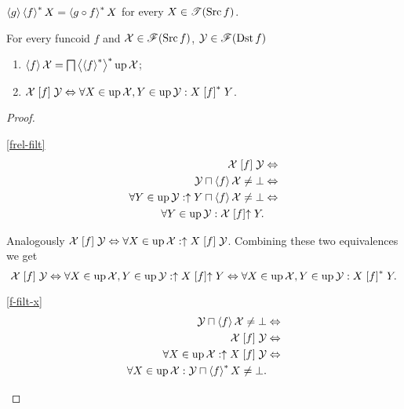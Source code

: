 \begin{obvious}
$\left\langle g\right\rangle\left\langle f\right\rangle ^{\ast}X=\left\langle g\circ f\right\rangle ^{\ast}X$ for every $X\in\mathscr{T}(\operatorname{Src}
f)$.\end{obvious}
\begin{thm}
For every funcoid $f$ and $\mathcal{X}\in\mathscr{F}(\operatorname{Src} f)$,
$\mathcal{Y}\in\mathscr{F}(\operatorname{Dst} f)$
\begin{enumerate}
\item \label{f-filt-x}$\left\langle f\right\rangle\mathcal{X}=\bigsqcap\left\langle \left\langle f\right\rangle ^{\ast}\right\rangle ^{\ast}\operatorname{up}\mathcal{X}$;
\item \label{frel-filt}$\mathcal{X}\mathrel{\left[f\right]}\mathcal{Y}\Leftrightarrow\forall
X\in\operatorname{up}\mathcal{X},Y\in\operatorname{up}\mathcal{Y}:X\mathrel{\left[f\right]^{\ast}}Y$.
\end{enumerate}
\end{thm}
\begin{proof}
~
\begin{widedisorder}
\item [{\ref{frel-filt}}] ~
\begin{align*}
\mathcal{X}\mathrel{\left[f\right]}\mathcal{Y} & \Leftrightarrow\\
\mathcal{Y}\sqcap\left\langle f\right\rangle\mathcal{X}\ne\bot &
\Leftrightarrow\\
\forall Y\in\operatorname{up}\mathcal{Y}:\uparrow Y\sqcap\left\langle f\right\rangle\mathcal{X}\ne\bot & \Leftrightarrow\\
\forall Y\in\operatorname{up}\mathcal{Y}:\mathcal{X}\mathrel{\left[f\right]}\uparrow Y.
\end{align*}



Analogously $\mathcal{X}\mathrel{\left[f\right]}\mathcal{Y}\Leftrightarrow\forall
X\in\operatorname{up}\mathcal{X}:\uparrow X\mathrel{\left[f\right]}\mathcal{Y}$.
Combining these two equivalences we get
\[
\mathcal{X}\mathrel{\left[f\right]}\mathcal{Y}\Leftrightarrow\forall
X\in\operatorname{up}\mathcal{X},Y\in\operatorname{up}\mathcal{Y}:\uparrow X\mathrel{\left[f\right]}\uparrow
Y\Leftrightarrow\forall X\in\operatorname{up}\mathcal{X},Y\in\operatorname{up}\mathcal{Y}:X\mathrel{\left[f\right]^{\ast}}Y.
\]


\item [{\ref{f-filt-x}}] ~
\begin{align*}
\mathcal{Y}\sqcap\left\langle f\right\rangle\mathcal{X}\ne\bot &
\Leftrightarrow\\
\mathcal{X}\mathrel{\left[f\right]}\mathcal{Y} & \Leftrightarrow\\
\forall X\in\operatorname{up}\mathcal{X}:\uparrow X\mathrel{\left[f\right]}\mathcal{Y} & \Leftrightarrow\\
\forall X\in\operatorname{up}\mathcal{X}:\mathcal{Y}\sqcap\left\langle f\right\rangle ^{\ast}X\ne\bot.
\end{align*}




\end{widedisorder}
\end{proof}
